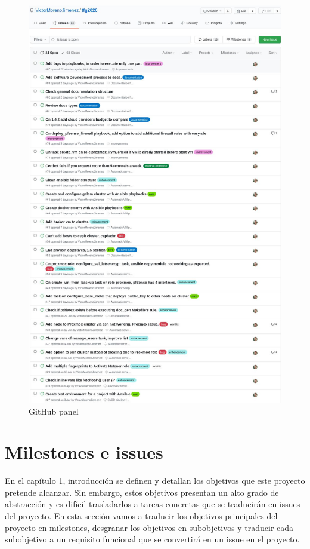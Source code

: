 \begin{text}
	
	\begin{figure}[!hbt]
		\centering
		\includegraphics[scale=0.46]{imagenes/Analisis/githubissues.jpg}
		\caption[GitHub panel]{GitHub panel \cite{githubrepo:online}}
		\label{github_issues}
	\end{figure}
\end{text}
\clearpage

\section{Milestones e issues}
\begin{text}
	En el capítulo 1, introducción se definen y detallan los objetivos que este proyecto pretende alcanzar. Sin embargo, estos objetivos presentan un alto grado de abstracción y es difícil trasladarlos a tareas concretas que se traducirán en issues del proyecto. En esta sección vamos a traducir los objetivos principales del proyecto en milestones, desgranar los objetivos en subobjetivos y traducir cada subobjetivo a un requisito funcional que se convertirá en un issue en el proyecto.
\end{text}

